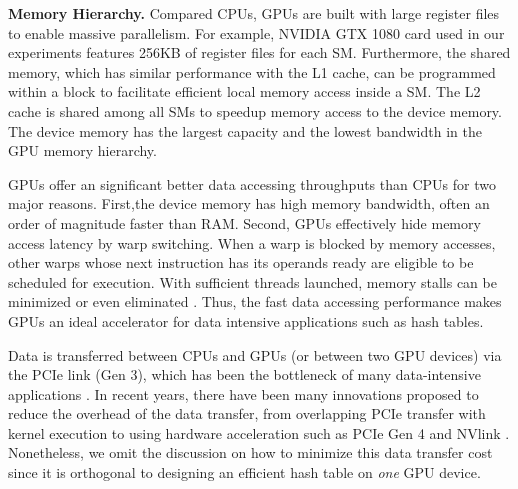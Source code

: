 \vspace{1mm}\noindent\textbf{Memory Hierarchy.} Compared CPUs, GPUs are built with large register files to enable massive parallelism. For example, NVIDIA GTX 1080 card used in our experiments features 256KB of register files for each SM. Furthermore, the shared memory, which has similar performance with the L1 cache, can be programmed within a block to facilitate efficient local memory access inside a SM.
The L2 cache is shared among all SMs to speedup memory access to the device memory. The device memory has the largest capacity and the lowest bandwidth in the GPU memory hierarchy.

GPUs offer an significant better data accessing throughputs than CPUs for two major reasons. 
First,the device memory has high memory bandwidth, often an order of magnitude faster than RAM.
Second, GPUs effectively hide memory access latency by warp switching. When a warp is blocked by memory accesses, other warps whose next instruction has its operands ready are eligible to be scheduled for execution. With sufficient threads launched, memory stalls can be minimized or even eliminated \cite{zhang2015mega}.
Thus, the fast data accessing performance makes GPUs an ideal accelerator for data intensive applications such as hash tables. 

Data is transferred between CPUs and GPUs (or between two GPU devices) via the PCIe link (Gen 3), which has been the bottleneck of many data-intensive applications \cite{zhang2015mega,kaldewey2012gpu,zhang2013omnidb}. In recent years, there have been many innovations proposed to reduce the overhead of the data transfer, from overlapping PCIe transfer with kernel execution to using hardware acceleration such as PCIe Gen 4 and NVlink \cite{thompto2016power9}. Nonetheless, we omit the discussion on how to minimize this data transfer cost since it is orthogonal to designing an efficient hash table on \emph{one} GPU device.

